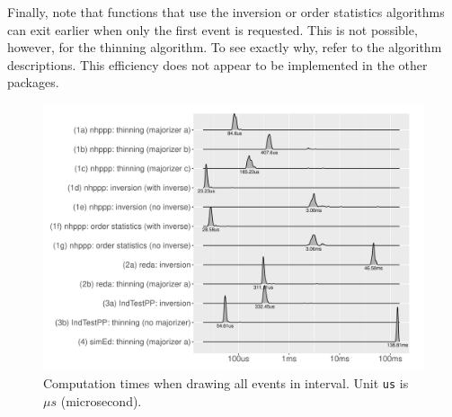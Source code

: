 \documentclass[article,nojss]{jss}\usepackage[]{graphicx}\usepackage[]{xcolor}
\makeatletter
\def\maxwidth{ %
  \ifdim\Gin@nat@width>\linewidth
    \linewidth
  \else
    \Gin@nat@width
  \fi
}
\newenvironment{knitrout}{}{} %
\makeatother
\begin{document}
Finally, note that  functions that use the inversion or order statistics algorithms can exit earlier when only the first event is requested. This is not possible, however, for the thinning algorithm. To see exactly why, refer to the algorithm descriptions. This efficiency does not appear to be implemented in the other packages.



\begin{knitrout}
\color{fgcolor}\begin{figure}
\includegraphics[width=\maxwidth]{figure/comptimes_all_samples-1} \caption[Computation times when drawing all events in interval]{Computation times when drawing all events in interval. Unit \texttt{us} is $\mu s$ (microsecond).}\label{fig:comptimes_all_samples}
\end{figure}

\end{knitrout}
\end{document}
